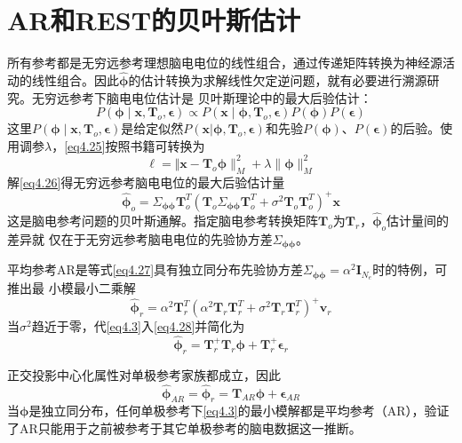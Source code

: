 \section{AR和REST的贝叶斯估计}
所有参考都是无穷远参考理想脑电电位的线性组合，通过传递矩阵转换为神经源活动的线性组合。因此$\hat{\mathbf{\phi}}$的估计转换为求解线性欠定逆问题，就有必要进行溯源研究。无穷远参考下脑电电位估计是
贝叶斯理论中的最大后验估计：
\begin{equation}\label{eq4.25}
P(\mathbf{\phi}\mid\mathbf{x},\mathbf{T}_o,\mathbf{\epsilon})\propto{P(\mathbf{x}\mid\mathbf{\phi},\mathbf{T}_o,\mathbf{\epsilon})P(\mathbf{\phi})P(\mathbf{\epsilon})}
\end{equation}
这里$P(\mathbf{\phi}\mid\mathbf{x},\mathbf{T}_o,\mathbf{\epsilon})$是给定似然$P(\mathbf{x}|\mathbf{\phi},\mathbf{T}_o,\mathbf{\epsilon})$和先验$P(\mathbf{\phi})$、$P(\mathbf{\epsilon})$的后验。使用调参$\lambda$，\eqref{eq4.25}按照书籍可转换为
\begin{equation}\label{eq4.26}
\ell = \Vert\mathbf{x}-\mathbf{T}_o\mathbf{\phi}\rVert_M^2+\lambda\lVert\mathbf{\phi}\rVert_M^2
\end{equation}
解\eqref{eq4.26}得无穷远参考脑电电位的最大后验估计量
\begin{equation}\label{eq4.27}
\hat{\mathbf{\phi}}_o=\Sigma_\mathbf{\phi\phi}\mathbf{T}_o^T(\mathbf{T}_o\Sigma_\mathbf{\phi\phi}\mathbf{T}_o^T+\sigma^2\mathbf{T}_o\mathbf{T}_o^T)^+\mathbf{x}
\end{equation}
这是脑电参考问题的贝叶斯通解。指定脑电参考转换矩阵$\mathbf{T}_o$为$\mathbf{T}_r$，$\hat{\mathbf{\phi}}_o$估计量间的差异就
仅在于无穷远参考脑电电位的先验协方差$\Sigma_{\mathbf{\phi\phi}}$。

平均参考AR是等式\eqref{eq4.27}具有独立同分布先验协方差$\Sigma_{\mathbf{\phi\phi}}=\alpha^2\mathbf{I}_{N_e}$时的特例，可推出最
小模最小二乘解
\begin{equation}\label{eq4.28}
\hat{\mathbf{\phi}}_r=\alpha^2\mathbf{T}_r^T(\alpha^2\mathbf{T}_r\mathbf{T}_r^T+\sigma^2\mathbf{T}_r\mathbf{T}_r^T)^+\mathbf{v}_r
\end{equation}
当$\sigma^2$趋近于零，代\eqref{eq4.3}入\eqref{eq4.28}并简化为
\begin{equation}\label{eq4.29}
\hat{\mathbf{\phi}}_r=\mathbf{T}_r^+\mathbf{T}_r\mathbf{\phi}+\mathbf{T}_r^+\mathbf{\epsilon}_r
\end{equation}

正交投影中心化属性对单极参考家族都成立，因此
\begin{equation}\label{eq4.30}
\hat{\mathbf{\phi}}_{AR}=\hat{\mathbf{\phi}}_r=\mathbf{T}_{AR}\mathbf{\phi}+\mathbf{\epsilon}_{AR}
\end{equation}
当$\mathbf{\phi}$是独立同分布，任何单极参考下\eqref{eq4.3}的最小模解都是平均参考（AR），验证了AR只能用于之前被参考于其它单极参考的脑电数据这一推断。

